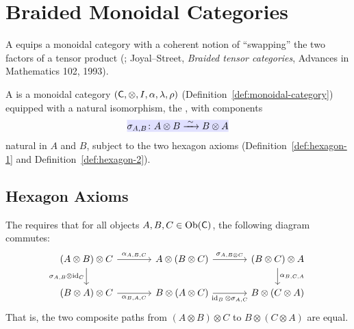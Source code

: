 \documentclass[../preamble]{subfiles}
\begin{document}
\section{Braided Monoidal Categories}
\label{sec:braided-monoidal}

A  equips a monoidal category
with a coherent notion of ``swapping'' the two factors of a tensor product
(;
Joyal--Street, \emph{Braided tensor categories}, Advances in Mathematics 102, 1993).

\begin{definition}
  \label{def:braided-monoidal}
  A 
  is a monoidal category
  $(\mathsf{C}, \otimes, I, \alpha, \lambda, \rho)$
  (Definition~\ref{def:monoidal-category})
  equipped with a natural isomorphism,
  the ,
  with components
  \begin{equation}
    \label{eq:braiding}
    \newmath{\sigma_{A,B}
      \colon A \otimes B
      \xrightarrow{\;\sim\;} B \otimes A}
  \end{equation}
  natural in $A$ and $B$,
  subject to the two hexagon axioms
  (Definition~\ref{def:hexagon-1} and Definition~\ref{def:hexagon-2}).
\end{definition}

\subsection{Hexagon Axioms}

\begin{definition}
  \label{def:hexagon-1}
  The  requires that
  for all objects $A, B, C \in \operatorname{Ob}(\mathsf{C})$,
  the following diagram commutes:
  \begin{equation}
    \label{eq:hexagon-1}
    \begin{tikzcd}[column sep=large]
      (A \otimes B) \otimes C
        \arrow[r, "\alpha_{A,B,C}"]
        \arrow[d, "\sigma_{A,B} \otimes \id_C"']
      & A \otimes (B \otimes C)
        \arrow[r, "\sigma_{A, B \otimes C}"]
      & (B \otimes C) \otimes A
        \arrow[d, "\alpha_{B,C,A}"]
      \\
      (B \otimes A) \otimes C
        \arrow[r, "\alpha_{B,A,C}"']
      & B \otimes (A \otimes C)
        \arrow[r, "\id_B \otimes \sigma_{A,C}"']
      & B \otimes (C \otimes A)
    \end{tikzcd}
  \end{equation}
  That is,
  the two composite paths from
  $(A \otimes B) \otimes C$
  to
  $B \otimes (C \otimes A)$
  are equal.
\end{definition}
\end{document}
